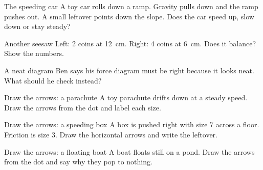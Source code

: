 \begin{puzzle}{The speeding car}
A toy car rolls down a ramp. Gravity pulls down and the ramp pushes out. A small leftover points down the slope. Does the car speed up, slow down or stay steady? \wline[3cm]
\end{puzzle}

\begin{puzzle}{Another seesaw}
Left: 2 coins at 12~cm. Right: 4 coins at 6~cm. Does it balance? \wline[2cm] Show the numbers. \wline[3cm]
\end{puzzle}

\begin{puzzle}{A neat diagram}
Ben says his force diagram must be right because it looks neat. What should he check instead? \wline[5cm]
\end{puzzle}

\clearpage
\begin{puzzle}{Draw the arrows: a parachute}
A toy parachute drifts down at a steady speed. Draw the arrows from the dot and label each size.
\begin{center}\end{center}
\end{puzzle}

\begin{puzzle}{Draw the arrows: a speeding box}
A box is pushed right with size 7 across a floor. Friction is size 3. Draw the horizontal arrows and write the leftover. \wline[3cm]
\begin{center}\end{center}
\end{puzzle}

\begin{puzzle}{Draw the arrows: a floating boat}
A boat floats still on a pond. Draw the arrows from the dot and say why they pop to nothing. \wline[4cm]
\begin{center}\end{center}
\end{puzzle}

